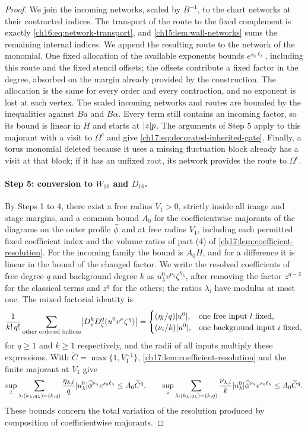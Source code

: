 \begin{proof}
We join the incoming networks, scaled by $B^{-1}$, to the chart networks at their contracted indices. The transport of the route to the fixed complement is exactly \eqref{ch16:eq:network-transport}, and \cref{ch15:lem:wall-networks} sums the remaining internal indices. We append the resulting route to the network of the monomial. One fixed allocation of the available exponents bounds $e^{s_0\ell_\lambda}$, including this route and the fixed stencil offsets; the offsets contribute a fixed factor in the degree, absorbed on the margin already provided by the construction. The allocation is the same for every order and every contraction, and no exponent is lost at each vertex. The scaled incoming networks and routes are bounded by the inequalities against $Ba$ and $B\alpha$. Every term still contains an incoming factor, so its bound is linear in $H$ and starts at $\lvert z\rvert p$. The arguments of Step 5 apply to this majorant with a visit to $\Omega^c$ and give \eqref{ch17:eq:decorated-inherited-gate}. Finally, a torus monomial deleted because it uses a missing fluctuation block already has a visit at that block; if it has an unfixed root, its network provides the route to $\Omega^c$.

\paragraph{Step 5: conversion to $W_{16}$ and $D_{16}$.}
By Steps 1 to 4, there exist a free radius $V_1>0$, strictly inside all image and stage margins, and a common bound $A_0$ for the coefficientwise majorants of the diagrams on the outer profile $\widehat\phi$ and at free radius $V_1$, including each permitted fixed coefficient index and the volume ratios of part (4) of \cref{ch17:lem:coefficient-resolution}. For the incoming family the bound is $A_0H$, and for a difference it is linear in the bound of the changed factor. We write the resolved coefficients of free degree $q$ and background degree $k$ as $u^0_\lambda v^{\nu_\lambda}\zeta^{\eta_\lambda}$, after removing the factor $z^{q-2}$ for the classical terms and $z^q$ for the others; the ratios $\lambda_i$ have modulus at most one. The mixed factorial identity is
\[
 \frac1{k!\,q!}\sum_{\text{other ordered indices}}\bigl\lvert D_v^kD_\zeta^q(u^0v^\nu\zeta^\eta)\bigr\rvert=\begin{cases}(\eta_l/q)\lvert u^0\rvert,&\text{one free input }l\text{ fixed},\\(\nu_i/k)\lvert u^0\rvert,&\text{one background input }i\text{ fixed},\end{cases}
\]
for $q\ge1$ and $k\ge1$ respectively, and the radii of all inputs multiply these expressions. With $\widetilde C=\max\{1,V_1^{-1}\}$, \cref{ch17:lem:coefficient-resolution} and the finite majorant at $V_1$ give
\[
 \sup_l\sum_{\lambda:(k_\lambda,q_\lambda)=(k,q)}\frac{\eta_{\lambda,l}}q\lvert u^0_\lambda\rvert\widehat\phi^{\nu_\lambda}e^{s_0\ell_\lambda}\le A_0\widetilde C^q,\qquad
 \sup_i\sum_{\lambda:(k_\lambda,q_\lambda)=(k,q)}\frac{\nu_{\lambda,i}}k\lvert u^0_\lambda\rvert\widehat\phi^{\nu_\lambda}e^{s_0\ell_\lambda}\le A_0\widetilde C^q.
\]
These bounds concern the total variation of the resolution produced by composition of coefficientwise majorants.


\end{proof}
